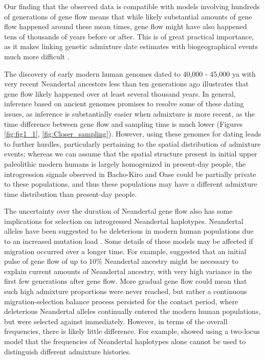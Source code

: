\documentclass[11pt]{article}
\begin{document}
Our finding that the observed data is compatible with models involving hundreds of generations of gene flow means that while likely substantial amounts of gene flow happened around these mean times, gene flow might have also happened tens of thousands of years before or after. This is of great practical importance, as it makes linking genetic admixture date estimates with biogeographical events much more difficult \citep{sankararaman_date_2012,lazaridis_genomic_2016,douka_age_2019,jacobs_multiple_2019,vyas_analyses_2019}. 

The discovery of early modern human genomes dated to 40,000 - 45,000 ya with very recent Neandertal ancestors less than ten generations ago \citep{fu_genome_2014, hajdinjak_initial_2021} illustrates that gene flow likely happened over at least several thousand years.  In general, inference based on ancient genomes \citep{fu_genome_2014, fu_early_2015, moorjani_genetic_2016, hajdinjak_initial_2021} promises to resolve some of these dating issues, as inference is substantially easier when admixture is more recent, as the time difference between gene flow and sampling time is much lower (Figures \ref{fig:fig1_1}, \ref{fig:Closer_sampling}). However, using these genomes for dating leads to further hurdles, particularly pertaining to the spatial distribution of admixture events; whereas we can assume that the spatial structure present in initial upper paleolithic modern humans is largely homogenized in present-day people, the introgression signals observed in Bacho-Kiro and Oase could be partially private to these populations, and thus these populations may have a different admixture time distribution than present-day people.

The uncertainty over the duration of Neandertal gene flow also has some implications for selection on introgressed Neandertal haplotypes. Neandertal alleles have been suggested to be deleterious in modern human populations due to an increased mutation load \citep{harris_genetic_2016, juric_strength_2016}. Some details of these models may be affected if migration occurred over a longer time. For example, \cite{harris_genetic_2016} suggested that an initial pulse of gene flow of up to 10\% Neandertal ancestry might be necessary to explain current amounts of Neandertal ancestry, with very high variance in the first few generations after gene flow. More gradual gene flow could mean that such high admixture proportions were never reached, but rather a continuous migration-selection balance process persisted for the contact period, where deleterious Neandertal alleles continually entered the modern human populations, but were selected against immediately. 
However, in terms of the overall frequencies, there is likely little difference. For example, \cite{juric_strength_2016} showed using a two-locus model that the frequencies of Neandertal haplotypes alone cannot be used to distinguish different admixture histories.
\end{document}
